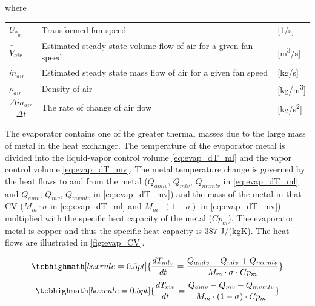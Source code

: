 where
\smallskip
\begin{center}
	\begin{tabular}{l p{10cm} l}
		$ U_{*_{\dot{m}}} $ 						& Transformed fan speed												& [1/\si{s}]\\
		$\bar{\dot{V}}_{air}$						& Estimated steady state volume flow of air for a given fan speed 	& [\si{m^3}/\si{s}] \\
		$\bar{\dot{m}}_{air}$						& Estimated steady state mass flow of air for a given fan speed 	& [\si{kg}/\si{s}] \\
		$\rho_{air}$								& Density of air													& [\si{kg}/\si{m^3}] \\[0.2cm]
		$\dfrac{\Delta \dot{m}_{air}}{\Delta t} $ 	& The rate of change of	air flow 									& [\si{kg}/\si{s^2}]
	\end{tabular}
\end{center}
\medskip
The evaporator contains one of the greater thermal masses due to the large mass of metal in the heat exchanger. The temperature of the evaporator metal is divided into the liquid-vapor control volume \cref{eq:evap_dT_ml} and the vapor control volume \cref{eq:evap_dT_mv}. The metal temperature change is governed by the heat flows to and from the metal ($Q_{amlv}$, $Q_{mlv}$, $Q_{mvmlv}$ in \cref{eq:evap_dT_ml} and $Q_{amv}$, $Q_{mv}$, $Q_{mvmlv}$ in \cref{eq:evap_dT_mv}) and the mass of the metal in that CV ($M_m \cdot \sigma$ in \cref{eq:evap_dT_ml} and $M_m \cdot (1 - \sigma)$ in \cref{eq:evap_dT_mv}) multiplied with the specific heat capacity of the metal ($Cp_m$). The evaporator metal is copper and thus the specific heat capacity is $387$ \si{J}/(\si{kg}\si{K}). The heat flows are illustrated in \cref{fig:evap_CV}.


\begin{equation}
	\tcbhighmath[boxrule = 0.5pt]{ 	\frac{dT_{mlv}}{dt}  = \frac{Q_{amlv}-Q_{mlv} + Q_{mvmlv}}{M_m \cdot \sigma \cdot Cp_m}  }    \label{eq:evap_dT_ml}
\end{equation}
\begin{equation}
	\tcbhighmath[boxrule = 0.5pt]{ \frac{dT_{mv}}{dt} = \frac{Q_{amv} - Q_{mv} - Q_{mvmlv}}{M_m \cdot (1 - \sigma) \cdot Cp_m } }     \label{eq:evap_dT_mv}
\end{equation}

